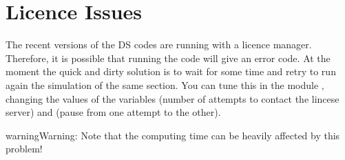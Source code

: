 \documentclass[letterpaper,10pt,english]{sphinxmanual}
\begin{document}
\section{Licence Issues}
\label{\detokenize{notes:licence-issues}}
The recent versions of the DS codes are running with a licence
manager. Therefore, it is possible that running the code will give an
error code. At the moment the quick and dirty solution is to wait for
some time and retry to run again the simulation of the same
section. You can tune this in the module , changing the
values of the variables  (number of attempts to contact
the lincese server) and  (pause from one attempt to the
other).

\begin{sphinxadmonition}{warning}{Warning:}
Note that the computing time can be heavily affected by
this problem!
\end{sphinxadmonition}
\end{document}
